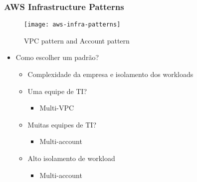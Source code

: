 \begin{frame}[allowframebreaks]
	\frametitle{AWS Infrastructure Patterns}
	\begin{figure}[htpb]
		\centering
		\texttt{[image: aws-infra-patterns]}
		\caption{VPC pattern and Account pattern\cite{FrisbyMcgibney}}
	\end{figure}
	\framebreak
	\begin{itemize}
		\item Como escolher um padrão?
			\begin{itemize}
				\item Complexidade da empresa e isolamento dos workloads
				\item Uma equipe de TI?
					\begin{itemize}
						\item Multi-VPC
					\end{itemize}
				\item Muitas equipes de TI?
					\begin{itemize}
						\item Multi-account
					\end{itemize}
				\item Alto isolamento de workload
					\begin{itemize}
						\item Multi-account
					\end{itemize}
			\end{itemize}
	\end{itemize}
\end{frame}

